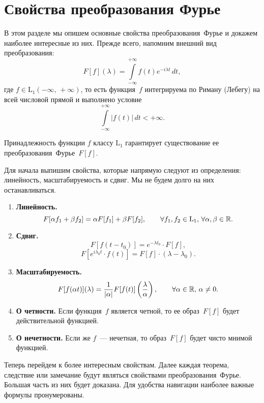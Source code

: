 \section{Свойства преобразования Фурье}

В этом разделе мы опишем основные свойства преобразования~Фурье и докажем наиболее интересные из них.
Прежде всего, напомним внешний вид преобразования:
$$
        F[f] (\lambda) = \int\limits_{-\infty}^{+\infty}f(t)e^{-i\lambda t}\, dt,
$$
где $f \in \mbox{L}_1(-\infty,\,+\infty)$, то есть функция~$f$ интегрируема по Риману (Лебегу) на всей числовой прямой и выполнено условие
$$
        \int\limits_{-\infty}^{+\infty}|f(t)|\,dt < +\infty. 
$$

\begin{remark}
        Принадлежность функции $f$ классу $\mbox{L}_1$ гарантирует существование ее преобразования~Фурье~$F[f]$.
\end{remark}

Для начала выпишим свойства, которые напрямую следуют из определения: линейность, масштабируемость и сдвиг. Мы не будем долго на них останавливаться.
\begin{enumerate}
        \item \textbf{Линейность.}
$$
        F[\alpha f_1 + \beta f_2]
=
        \alpha F[f_1] + \beta F[f_2],
\qquad
        \forall f_1,f_2 \in \mbox{L}_1,\,\forall \alpha,\beta \in \mathbb{R}.
$$
        \item \textbf{Сдвиг.}
$$
        F[f(t - t_0)] = e^{-\lambda t_0}\cdot F[f],
$$
$$
        F[e^{i\lambda_0 t}\cdot f(t)] = F[f]\cdot(\lambda - \lambda_0).
$$
        \item \textbf{Масштабируемость.}
$$
        F[f(\alpha t)](\lambda) = \frac{1}{|\alpha|}F[f(t)]\left(\frac{\lambda}{\alpha}\right),
\qquad
        \forall \alpha \in \mathbb{R},\,\alpha \neq 0.
$$
        \item \textbf{О четности.} Если функция~$f$ является четной, то ее образ~$F[f]$ будет действительной функцией.
        \item \textbf{О нечетности.} Если же $f$~--- нечетная, то образ~$F[f]$ будет чисто мнимой функцией.
\end{enumerate}

Теперь перейдем к более интересным свойствам. Далее каждая теорема, следствие или замечание будут являться свойствами преобразования~Фурье. Большая часть из них будет доказана. Для удобства навигации наиболее важные формулы пронумерованы.

